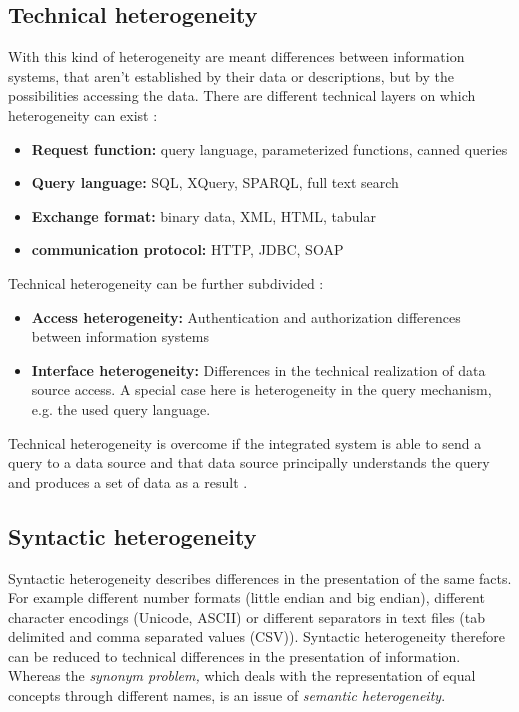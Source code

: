 \subsection{Technical  heterogeneity}
With this kind of heterogeneity are meant differences between information systems, that aren't established by their data or descriptions, but by the possibilities accessing the data. There are different technical layers on which heterogeneity can exist \cite[p. 62]{DBLP:books/dp/LeserN2006}:
\begin{itemize}
\item \textbf{Request function:} query language, parameterized  functions, canned queries
\item \textbf{Query language:} SQL, XQuery, SPARQL, full text search
\item \textbf{Exchange format:} binary data, XML, HTML, tabular
\item \textbf{communication protocol:} HTTP, JDBC, SOAP
\end{itemize}

Technical heterogeneity can be further subdivided \cite[p. 64]{DBLP:books/dp/LeserN2006}: \label{technical_heterogeneity_subtypes}
\begin{itemize}
\item \textbf{Access heterogeneity:} Authentication and authorization differences between information systems
\item \textbf{Interface heterogeneity:} Differences in the technical realization of data source access. A special case here is heterogeneity in the query mechanism, e.g. the used query language.
\end{itemize}

Technical  heterogeneity is overcome if the integrated system is able to send a query to a data source and that data source principally understands the query and produces a set of data as a result \cite[p. 61]{DBLP:books/dp/LeserN2006}.

\subsection{Syntactic  heterogeneity}
Syntactic heterogeneity describes differences in the presentation of the same facts\cite[p. 64]{DBLP:books/dp/LeserN2006}. For example different number formats (little endian and big endian), different character encodings (Unicode, ASCII) or different separators in text files (tab delimited and comma separated values (CSV)). Syntactic heterogeneity therefore can be reduced to technical differences in the presentation of information. Whereas the \textit{synonym problem,} which deals with the representation of equal concepts through different names, is an issue of \textit{semantic heterogeneity}.

